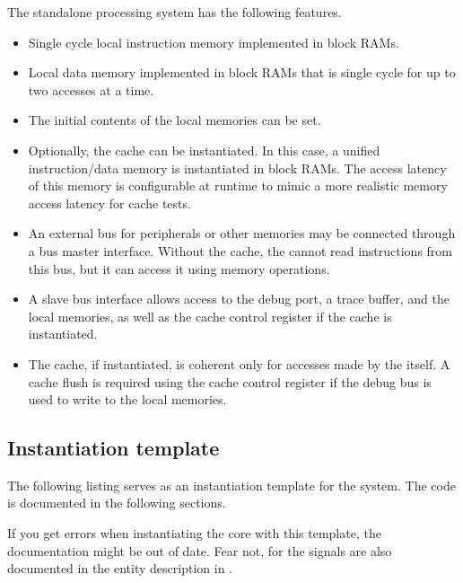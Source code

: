 
\label{sec:rvsyssa}

The \rvex{} standalone processing system has the following features.

\begin{itemize}

\item Single cycle local instruction memory implemented in block RAMs.

\item Local data memory implemented in block RAMs that is single cycle for up to
two accesses at a time.

\item The initial contents of the local memories can be set.

\item Optionally, the cache can be instantiated. In this case, a unified
instruction/data memory is instantiated in block RAMs. The access latency of
this memory is configurable at runtime to mimic a more realistic memory access
latency for cache tests.

\item An external bus for peripherals or other memories may be connected through 
a bus master interface. Without the cache, the \rvex{} cannot read instructions 
from this bus, but it can access it using memory operations.

\item A slave bus interface allows access to the \rvex{} debug port, a trace
buffer, and the local memories, as well as the cache control register if the
cache is instantiated.

\item The cache, if instantiated, is coherent only for accesses made by the
\rvex{} itself. A cache flush is required using the cache control register if
the debug bus is used to write to the local memories.

\end{itemize}

\subsection{Instantiation template}
\label{sec:rvsyssa-inst}

The following listing serves as an instantiation template for the system. The 
code is documented in the following sections.

If you get errors when instantiating the core with this template, the
documentation might be out of date. Fear not, for the signals are also
documented in the entity description in .

